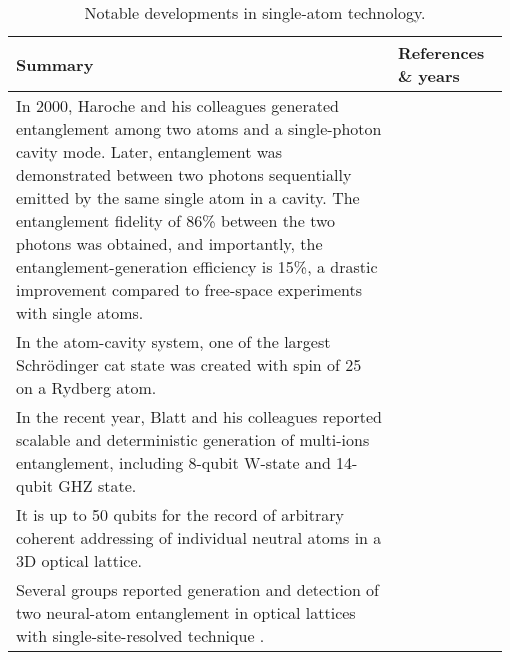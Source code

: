 \begin{table*}[!htbp]
	\begin{tabular}{|p{0.755\linewidth}|p{0.22\linewidth}|}
		\hline
	\textbf{Summary} & \textbf{References \& years} \\	\hline \hline
		In 2000, Haroche and his colleagues generated entanglement among two atoms and a single-photon cavity mode. Later, entanglement was demonstrated between two photons sequentially emitted by the same single atom in a cavity. The entanglement fidelity of 86\% between the two photons was obtained, and importantly, the entanglement-generation efficiency is 15\%, a drastic improvement compared to free-space experiments with single atoms. & \cite{bib:rauschenbeutel2000step, bib:wilk2007single, bib:blinov2004observation} \\
		\hline
		In the atom-cavity system, one of the largest Schr{\"o}dinger cat state was created with spin of 25 on a Rydberg atom. & \cite{bib:facon2016sensitive} \\
		\hline
		In the recent year, Blatt and his colleagues reported scalable and deterministic generation of multi-ions entanglement, including 8-qubit W-state and 14-qubit GHZ state. & \cite{bib:haffner2005scalable, bib:monz2011}\\
		\hline
		It is up to 50 qubits for the record of arbitrary coherent addressing of individual neutral atoms in a 3D optical lattice. & \cite{bib:wang2015coherent} \\
		\hline		
		Several groups reported generation and detection of two neural-atom entanglement in optical lattices with single-site-resolved technique . & \cite{bib:kaufman2015entangling, bib:islam2015measuring, bib:dai2016generation}\\
		\hline
	\end{tabular}
	\captionspacetab \caption{Notable developments in single-atom technology.} \label{tab:single_atoms}
\end{table*}

